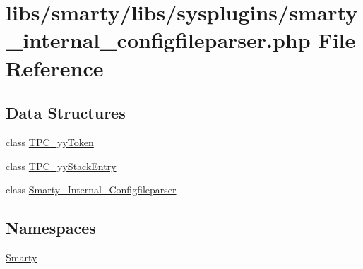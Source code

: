 \hypertarget{smarty__internal__configfileparser_8php}{}\section{libs/smarty/libs/sysplugins/smarty\+\_\+internal\+\_\+configfileparser.php File Reference}
\label{smarty__internal__configfileparser_8php}
\subsection*{Data Structures}
\begin{DoxyCompactItemize}
\item 
class \hyperlink{class_t_p_c__yy_token}{T\+P\+C\+\_\+yy\+Token}
\item 
class \hyperlink{class_t_p_c__yy_stack_entry}{T\+P\+C\+\_\+yy\+Stack\+Entry}
\item 
class \hyperlink{class_smarty___internal___configfileparser}{Smarty\+\_\+\+Internal\+\_\+\+Configfileparser}
\end{DoxyCompactItemize}
\subsection*{Namespaces}
\begin{DoxyCompactItemize}
\item 
 \hyperlink{namespace_smarty}{Smarty}
\end{DoxyCompactItemize}
